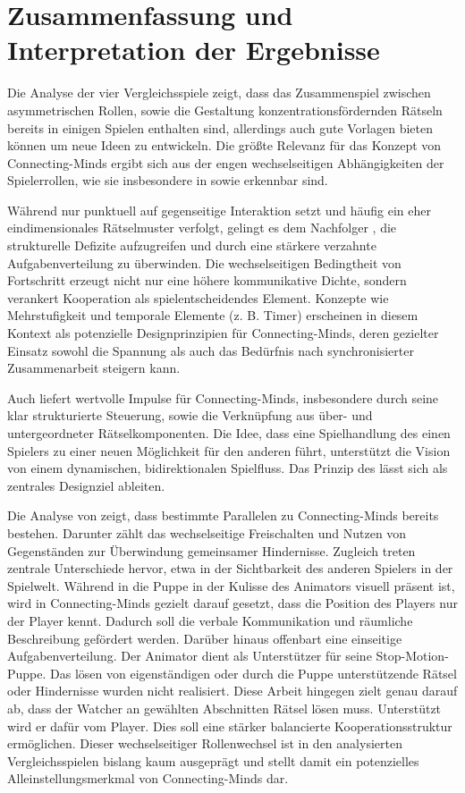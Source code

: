 \section{Zusammenfassung und Interpretation der Ergebnisse}
Die Analyse der vier Vergleichsspiele zeigt, dass das Zusammenspiel zwischen asymmetrischen Rollen, sowie die Gestaltung konzentrationsfördernden Rätseln  bereits in einigen Spielen enthalten sind, allerdings auch gute Vorlagen bieten können um neue Ideen zu entwickeln.
Die größte Relevanz für das Konzept von Connecting-Minds ergibt sich aus der engen wechselseitigen Abhängigkeiten der Spielerrollen, wie sie insbesondere in  sowie  erkennbar sind.

Während  nur punktuell auf gegenseitige Interaktion setzt und häufig ein eher eindimensionales Rätselmuster verfolgt, gelingt es dem Nachfolger , die strukturelle Defizite aufzugreifen und durch eine stärkere verzahnte Aufgabenverteilung zu überwinden. Die wechselseitigen Bedingtheit von Fortschritt erzeugt nicht nur eine höhere kommunikative Dichte, sondern verankert Kooperation als spielentscheidendes Element. Konzepte wie Mehrstufigkeit und temporale Elemente (z. B. Timer) erscheinen in diesem Kontext als potenzielle Designprinzipien für Connecting-Minds, deren gezielter Einsatz sowohl die Spannung als auch das Bedürfnis nach synchronisierter Zusammenarbeit steigern kann.

Auch  liefert wertvolle Impulse für Connecting-Minds, insbesondere durch seine klar strukturierte Steuerung, sowie die Verknüpfung aus über- und untergeordneter Rätselkomponenten. Die Idee, dass eine Spielhandlung des einen Spielers zu einer neuen Möglichkeit für den anderen führt, unterstützt die Vision von einem dynamischen, bidirektionalen Spielfluss. Das Prinzip des  lässt sich als zentrales Designziel ableiten.

Die Analyse von  zeigt, dass bestimmte Parallelen zu Connecting-Minds bereits bestehen. Darunter zählt das wechselseitige Freischalten und Nutzen von Gegenständen zur Überwindung gemeinsamer Hindernisse. Zugleich treten zentrale Unterschiede hervor, etwa in der Sichtbarkeit des anderen Spielers in der Spielwelt. Während in  die Puppe in der Kulisse des Animators visuell präsent ist, wird in Connecting-Minds gezielt darauf gesetzt, dass die Position des Players nur der Player kennt. Dadurch soll die verbale Kommunikation und räumliche Beschreibung gefördert werden.
Darüber hinaus offenbart  eine einseitige Aufgabenverteilung. Der Animator dient als Unterstützer für seine Stop-Motion-Puppe. Das lösen von eigenständigen oder durch die Puppe unterstützende Rätsel oder Hindernisse wurden nicht realisiert. Diese Arbeit hingegen zielt genau darauf ab, dass der Watcher an gewählten Abschnitten Rätsel lösen muss. Unterstützt wird er dafür vom Player. Dies soll eine stärker balancierte Kooperationsstruktur ermöglichen. Dieser wechselseitiger Rollenwechsel ist in den analysierten Vergleichsspielen bislang kaum ausgeprägt und stellt damit ein potenzielles Alleinstellungsmerkmal von Connecting-Minds dar.

